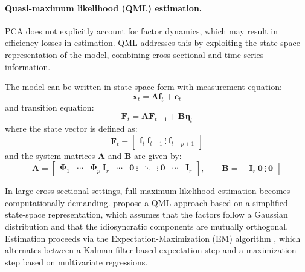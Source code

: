 \paragraph{Quasi-maximum likelihood (QML) estimation.}

PCA does not explicitly account for factor dynamics, which may result in efficiency losses in estimation. QML addresses this by exploiting the state-space representation of the model, combining cross-sectional and time-series information.

The model can be written in state-space form with measurement equation:
\begin{equation}
\boldsymbol{x}_t = \boldsymbol{\Lambda} \boldsymbol{f}_t + \boldsymbol{e}_t
\end{equation}
and transition equation:
\begin{equation}
\boldsymbol{F}_t = \boldsymbol{A} \boldsymbol{F}_{t-1} + \boldsymbol{B} \boldsymbol{\eta}_t
\end{equation}
where the state vector is defined as:
\begin{equation}
\boldsymbol{F}_t =
\begin{bmatrix}
\boldsymbol{f}_t \
\boldsymbol{f}_{t-1} \
\vdots \
\boldsymbol{f}_{t-p+1}
\end{bmatrix}
\end{equation}
and the system matrices $\boldsymbol{A}$ and $\boldsymbol{B}$ are given by:
\begin{equation}
\boldsymbol{A} =
\begin{bmatrix}
\boldsymbol{\Phi}_1 & \cdots & \boldsymbol{\Phi}_p \
\boldsymbol{I}_r & \cdots & \boldsymbol{0} \
\vdots & \ddots & \vdots \
\boldsymbol{0} & \cdots & \boldsymbol{I}_r
\end{bmatrix},
\qquad
\boldsymbol{B} =
\begin{bmatrix}
\boldsymbol{I}_r \
\boldsymbol{0} \
\vdots \
\boldsymbol{0}
\end{bmatrix}
\end{equation}

In large cross-sectional settings, full maximum likelihood estimation becomes computationally demanding. \citet{doz2012quasi} propose a QML approach based on a simplified state-space representation, which assumes that the factors follow a Gaussian distribution and that the idiosyncratic components are mutually orthogonal. Estimation proceeds via the Expectation-Maximization (EM) algorithm \citep{watson1983alternative}, which alternates between a Kalman filter-based expectation step and a maximization step based on multivariate regressions.

